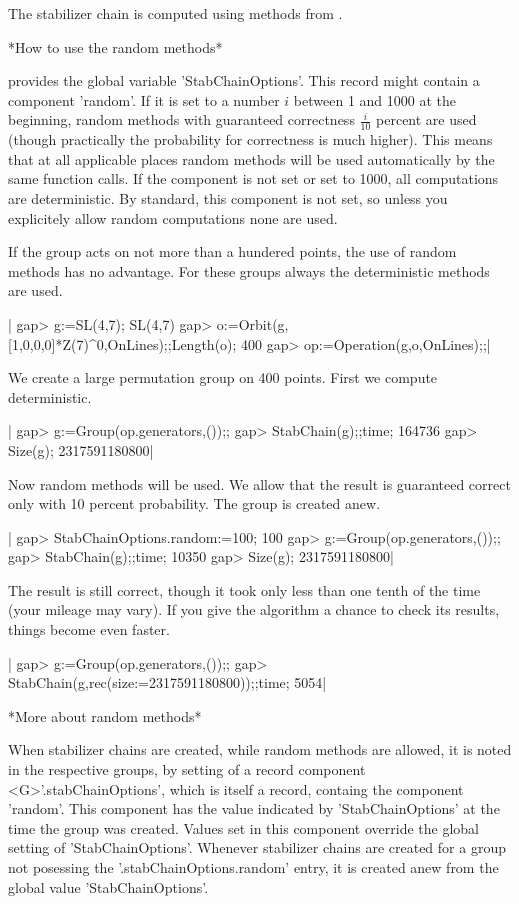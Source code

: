 The stabilizer chain is computed using methods from \cite{BCFS91}.

*How to use the random methods*

{\GAP} provides the global variable 'StabChainOptions'. This record might
contain a component 'random'. If it is set to a number $i$ between 1 and
1000 at the beginning, random methods with guaranteed correctness
$\frac{i}{10}$ percent are used (though practically the probability for
correctness is much higher). This means that at all applicable
places random methods will be used automatically by the same function calls.
If the component is not set or set to 1000, all computations are
deterministic. By standard, this component is not set, so unless you
explicitely allow random computations none are used.

If the group acts on not more than a hundered points, the use of random
methods has no advantage. For these groups always the deterministic methods
are used.

|    gap> g:=SL(4,7);
    SL(4,7)
    gap> o:=Orbit(g,[1,0,0,0]*Z(7)^0,OnLines);;Length(o);
    400
    gap> op:=Operation(g,o,OnLines);;|

We create a large permutation group on 400 points. First we compute
deterministic.

|    gap> g:=Group(op.generators,());;
    gap> StabChain(g);;time;
    164736
    gap> Size(g);
    2317591180800|

Now random methods will be used. We allow that the result is guaranteed
correct only with 10 percent probability. The group is created anew.

|    gap> StabChainOptions.random:=100;
    100
    gap> g:=Group(op.generators,());;
    gap> StabChain(g);;time;
    10350
    gap> Size(g);
    2317591180800|

The result is still correct, though it took only less than one tenth of the
time (your mileage may vary). If you give the algorithm a chance to check its
results, things become even faster.

|    gap> g:=Group(op.generators,());;
    gap> StabChain(g,rec(size:=2317591180800));;time;
    5054|

*More about random methods*

When stabilizer chains are created, while random methods are allowed, it is
noted in the respective groups, by setting of a record component
<G>'.stabChainOptions', which is itself a record, containg the component
'random'. This component has the value indicated by 'StabChainOptions' at the
time the group was created. Values set in this component override
the global setting of 'StabChainOptions'. Whenever stabilizer chains are
created for a group not posessing the '.stabChainOptions.random' entry, it is
created anew from the global value 'StabChainOptions'.

